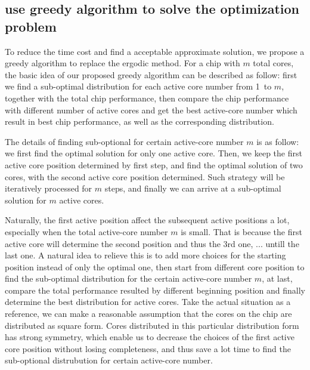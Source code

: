 \subsection{use greedy algorithm to solve the optimization problem}


To reduce the time cost and find a acceptable approximate solution, we propose a greedy algorithm to replace the ergodic method.
For a chip with $m$ total cores, the basic idea of our proposed greedy algorithm can be described as follow: first we find a sub-optimal distribution for each active
core number from \SI{1} to $m$, together with the total chip performance, then compare the chip performance with different number of active cores and get
the best active-core number which result in best chip performance, as well as the corresponding distribution.

The details of finding sub-optional for certain active-core number $m$ is as follow: we first find the optimal solution for only one active core. Then, we keep
the first active core position determined by first step, and find the optimal solution of two cores, with the second active core position determined. Such strategy
will be iteratively processed for $m$ steps, and finally we can arrive at a sub-optimal solution for $m$ active cores.

Naturally, the first active position affect the subsequent active positions a lot, especially when the total active-core
number $m$ is small. That is because the first active core will determine the second position and thus the 3rd one, ...
untill the last one. A natural idea to relieve this is to add more choices for the starting position instead of only the
optimal one, then start from different core position to find the sub-optimal distribution for the certain active-core
number $m$, at last,  compare the total performance resulted by different beginning position and finally determine the
best distribution for active cores.
Take the actual situation as a reference, we can make a reasonable assumption that the cores on the chip are distributed as square form. Cores distributed in
this particular distribution form has strong symmetry, which enable us to decrease the choices of the first active core
position without losing completeness, and thus save a lot time to find the sub-optional distrubution for certain
active-core number.

